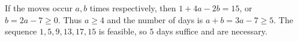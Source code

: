 If the moves occur $a,b$ times respectively, then $1+4a-2b=15$, or $b=2a-7\ge0$. Thus $a\ge4$ and the number of days is $a+b=3a-7\ge5$. The sequence $1,5,9,13,17,15$ is feasible, so $\boxed5$ days suffice and are necessary.
